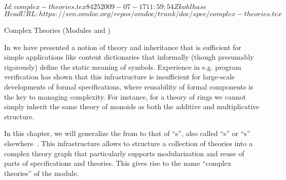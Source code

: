\svnInfo $Id: complex-theories.tex 8425 2009-07-17 11:59:54Z kohlhase $
\svnKeyword $HeadURL: https://svn.omdoc.org/repos/omdoc/trunk/doc/spec/complex-theories.tex $

\begin{omgroup}[id=complex-theories,short=Complex Theories,
                            creators=miko,contributors=frabe]
                           {Complex Theories (Modules   {} and {})}

In {} we have presented a notion of theory and inheritance that is
sufficient for simple applications like content dictionaries that informally (though
presumably rigorously) define the static meaning of symbols. Experience in e.g. program
verification has shown that this infrastructure is insufficient for large-scale
developments of formal specifications, where reusability of formal components is the key
to managing complexity. For instance, for a theory of rings we cannot simply inherit the
same theory of monoids as both the additive and multiplicative structure.

In this chapter, we will generalize the {} from
{} to that of ``{s}'', also called
``{s}'' or ``{s}''
elsewhere~\cite{Farmer93}.  This infrastructure allows to structure a collection of
theories into a complex theory graph that particularly supports modularization and reuse
of parts of specifications and theories. This gives rise to the name ``complex theories''
of the {\omdoc} module.


\end{omgroup}
